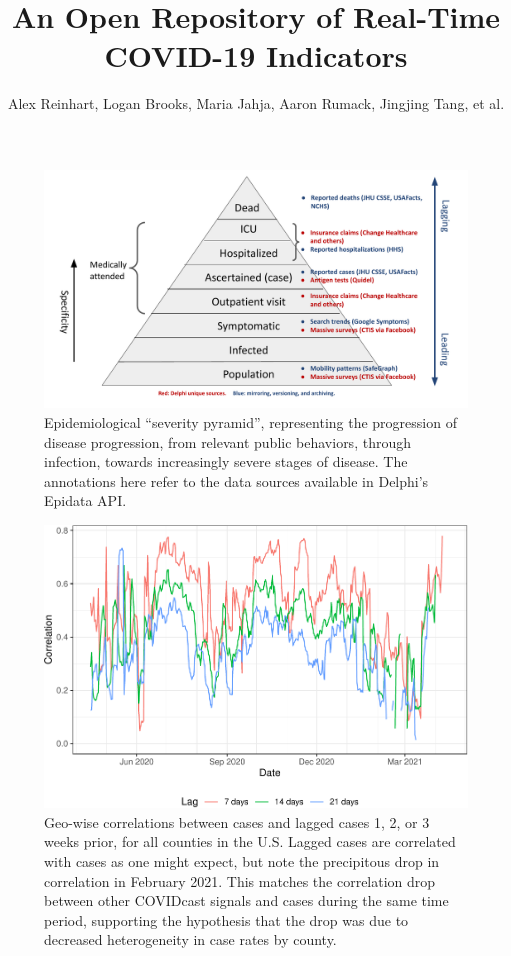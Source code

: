 \documentclass[9pt,twoside]{pnas-new}
\title{An Open Repository of Real-Time COVID-19 Indicators}
\author{Alex Reinhart, Logan Brooks, Maria Jahja, Aaron Rumack, Jingjing Tang,
  et al.}
\begin{document}
\maketitle

\begin{figure}
\includegraphics[width=\textwidth]{fig/severity-pyramid.pdf}
\caption{Epidemiological ``severity pyramid'', representing the progression of disease progression, from relevant public behaviors, through infection, towards increasingly severe stages of disease. The annotations here refer to the data sources available in Delphi's Epidata API.}
\label{fig:severity-pyramid}
\end{figure}

\clearpage

\begin{figure}

{\centering \includegraphics[width=\textwidth]{fig/case-correlation-lagged-plot-1} 

}

\caption{Geo-wise correlations between cases and lagged cases 1, 2, or 3 weeks prior, for all counties in the U.S. Lagged cases are correlated with cases as one might expect, but note the precipitous drop in correlation in February 2021. This matches the correlation drop between other COVIDcast signals and cases during the same time period, supporting the hypothesis that the drop was due to decreased heterogeneity in case rates by county.}\label{fig:case-correlation-lagged-plot}
\end{figure}
\end{document}
